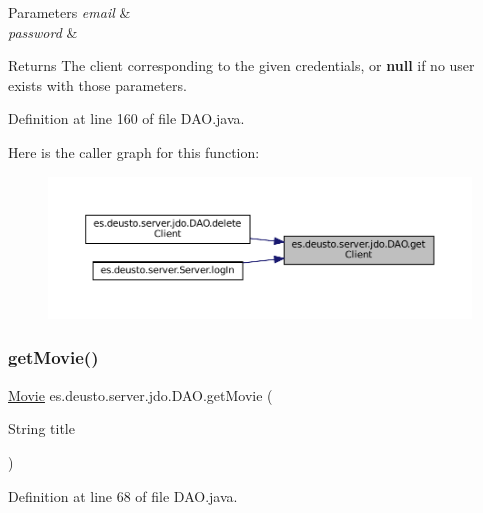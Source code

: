 \begin{DoxyParams}{Parameters}
{\em email} & \\
\hline
{\em password} & \\
\hline
\end{DoxyParams}
\begin{DoxyReturn}{Returns}
The client corresponding to the given credentials, or {\bfseries{null}} if no user exists with those parameters. 
\end{DoxyReturn}


Definition at line 160 of file D\+A\+O.\+java.

Here is the caller graph for this function\+:
\nopagebreak
\begin{figure}[H]
\begin{center}
\leavevmode
\includegraphics[width=350pt]{classes_1_1deusto_1_1server_1_1jdo_1_1_d_a_o_a340f51843de8957e9ef8b0c95081512a_icgraph}
\end{center}
\end{figure}
\mbox{\label{classes_1_1deusto_1_1server_1_1jdo_1_1_d_a_o_a9bbbc5fb0fa218f2feefc3c813edc305}} 
\subsubsection{\texorpdfstring{getMovie()}{getMovie()}}
{\footnotesize\ttfamily \mbox{\hyperlink{classes_1_1deusto_1_1server_1_1jdo_1_1_movie}{Movie}} es.\+deusto.\+server.\+jdo.\+D\+A\+O.\+get\+Movie (\begin{DoxyParamCaption}\item[{String}]{title }\end{DoxyParamCaption})}



Definition at line 68 of file D\+A\+O.\+java.

